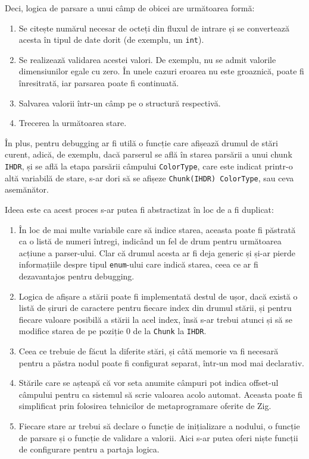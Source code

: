 \documentclass[a4paper,12pt]{report}
\begin{document}
Deci, logica de parsare a unui câmp de obicei are următoarea formă:
\begin{enumerate}
\item
    Se citește numărul necesar de octeți din fluxul de intrare
        și se convertează acesta în tipul de date dorit (de exemplu, un \texttt{int}).
\item
    Se realizează validarea acestei valori.
    De exemplu, nu se admit valorile dimensiunilor egale cu zero.
    În unele cazuri eroarea nu este groaznică, poate fi înresitrată, iar parsarea poate fi continuată.
\item
    Salvarea valorii într-un câmp pe o structură respectivă.
\item
    Trecerea la următoarea stare.
\end{enumerate}

În plus, pentru debugging ar fi utilă o funcție care afișează drumul de stări curent,
adică, de exemplu, dacă parserul se află în starea parsării a unui chunk \texttt{IHDR}, 
și se află la etapa parsării câmpului \texttt{ColorType},
care este indicat printr-o altă variabilă de stare,
s-ar dori să se afișeze \texttt{Chunk(IHDR) ColorType}, sau ceva asemănător.

Ideea este ca acest proces s-ar putea fi abstractizat în loc de a fi duplicat:
\begin{enumerate}
\item
    În loc de mai multe variabile care să indice starea, aceasta poate fi păstrată ca
    o listă de numeri întregi, indicând un fel de drum pentru următoarea acțiune a parser-ului.
    Clar că drumul acesta ar fi deja generic și și-ar pierde informațiile despre tipul
    \texttt{enum}-ului care indică starea, ceea ce ar fi dezavantajos pentru debugging.
\item
    Logica de afișare a stării poate fi implementată destul de ușor, dacă există o listă de
    șiruri de caractere pentru fiecare index din drumul stării,
    și pentru fiecare valoare posibilă a stării la acel index,
    însă s-ar trebui atunci și să se modifice starea
    de pe poziție 0 de la \texttt{Chunk} la \texttt{IHDR}.
\item
    Ceea ce trebuie de făcut la diferite stări,
    și câtă memorie va fi necesară pentru a păstra nodul poate fi configurat separat,
    într-un mod mai declarativ.
\item
    Stările care se așteapă că vor seta anumite câmpuri
    pot indica offset-ul câmpului pentru ca sistemul să scrie valoarea acolo automat.
    Aceasta poate fi simplificat prin folosirea tehnicilor de metaprogramare oferite de Zig.
\item
    Fiecare stare ar trebui să declare o funcție de inițializare a nodului,
    o funcție de parsare și o funcție de validare a valorii.
    Aici s-ar putea oferi niște funcții de configurare pentru a partaja logica.
\end{enumerate}
\end{document}
